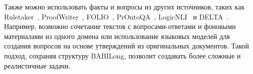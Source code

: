 Также можно использовать факты и вопросы из других источников, таких как Ruletaker~\cite{Clark2020Ruletaker}, ProofWriter~\cite{Tafjord2021ProofWriter}, FOLIO~\cite{folio}, PrOntoQA~\cite{saparov2023PrOntoQA}, LogicNLI~\cite{Tian2021LogicNLI} и DELTA~\cite{poulis2024delta}. Например, возможно сочетание текстов с вопросами-ответами и фоновыми материалами из одного домена или использование языковых моделей для создания вопросов на основе утверждений из оригинальных документов. Такой подход, сохраняя структуру BABILong, позволит создавать более сложные и реалистичные задачи.